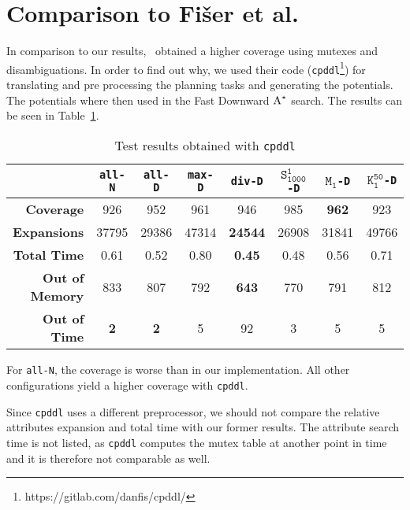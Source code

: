 \section{Comparison to Fi{\v{s}}er et al.}\label{sec:comparison-to-fiser}
In comparison to our results,~\cite{fivser2020strengthening} obtained a higher coverage using mutexes and disambiguations.
In order to find out why, we used their code (\texttt{cpddl}\footnote{https://gitlab.com/danfis/cpddl/}) for translating and pre processing the planning tasks and generating the potentials.
The potentials where then used in the Fast Downward $\textup{A}^\star$ search.
The results can be seen in Table~\ref{table:fiser}.

\begin{table}[h!]
    \begin{center}
        \begin{tabular}{|r|c|c|c|c|c|c|c|}
            \hline
            & \textbf{\texttt{all-N}} & \textbf{\texttt{all-D}} & \textbf{\texttt{max-D}} & \textbf{\texttt{div-D}} & \textbf{$\texttt{S}_\texttt{1000}^\texttt{1}$\texttt{-D}} & \textbf{$\texttt{M}_\texttt{1}$\texttt{-D}} & \textbf{$\texttt{K}_\texttt{1}^\texttt{50}$\texttt{-D}} \\
            \hline \hline
            \textbf{Coverage}       & 926       & 952       & 961   & 946           & 985   & \textbf{962}  & 923   \\ \hline
            \textbf{Expansions}     & 37795     & 29386     & 47314 & \textbf{24544}& 26908 & 31841         & 49766 \\ \hline
            \textbf{Total Time}     & 0.61      & 0.52      & 0.80  & \textbf{0.45} & 0.48  & 0.56          & 0.71  \\ \hline
            \textbf{Out of Memory}  & 833       & 807       & 792   & \textbf{643}  & 770   & 791           & 812   \\ \hline
            \textbf{Out of Time}    & \textbf{2}& \textbf{2}& 5     & 92            & 3     & 5             & 5     \\ \hline
        \end{tabular}
        \caption{Test results obtained with \texttt{cpddl}}
        \label{table:fiser}
    \end{center}
\end{table}

For \texttt{all-N}, the coverage is worse than in our implementation.
All other configurations yield a higher coverage with \texttt{cpddl}.

Since \texttt{cpddl} uses a different preprocessor, we should not compare the relative attributes expansion and total time with our former results.
The attribute search time is not listed, as \texttt{cpddl} computes the mutex table at another point in time and it is therefore not comparable as well.

